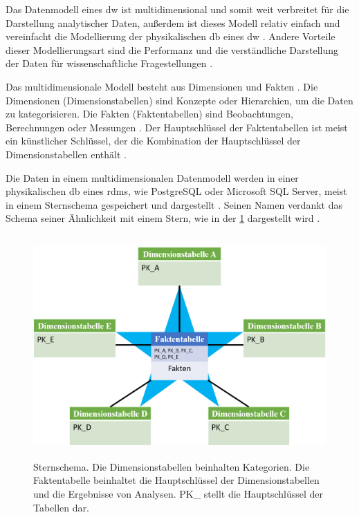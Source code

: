 Das Datenmodell eines \ac{dw} ist multidimensional und somit weit verbreitet für die Darstellung analytischer Daten, außerdem ist dieses Modell relativ einfach und vereinfacht die Modellierung der physikalischen \ac{db} eines \ac{dw} \cite{dwbauer}. Andere Vorteile dieser Modellierungsart sind die Performanz und die verständliche Darstellung der Daten für wissenschaftliche Fragestellungen \cite{dwtool}.

Das multidimensionale Modell besteht aus Dimensionen und Fakten \cite{dworiginal}. Die Dimensionen (Dimensionstabellen) sind Konzepte oder Hierarchien, um die Daten zu kategorisieren. Die Fakten (Faktentabellen) sind Beobachtungen, Berechnungen oder Messungen \cite{dwtool}. Der Hauptschlüssel der Faktentabellen ist meist ein künstlicher Schlüssel, der die Kombination der Hauptschlüssel der Dimensionstabellen enthält \cite{dwbauer, dwtool}. 

Die Daten in einem multidimensionalen Datenmodell werden in einer physikalischen \ac{db} eines \ac{rdms}, wie PostgreSQL oder Microsoft SQL Server, meist in einem Sternschema gespeichert und dargestellt \cite{dworiginal}. Seinen Namen verdankt das Schema seiner Ähnlichkeit mit einem Stern, wie in der \ref{fig:starschema} dargestellt wird \cite{dwtool}.

\clearpage

\begin{figure}[ht]
	\centering
	\includegraphics[height=8.5cm]{figures/starschema}
	\caption[Sternschema]{Sternschema. Die Dimensionstabellen beinhalten Kategorien. Die Faktentabelle beinhaltet die Hauptschlüssel der Dimensionstabellen und die Ergebnisse von Analysen. \glqq PK\_\grqq{} stellt die Hauptschlüssel der Tabellen dar.}
	\label{fig:starschema}
\end{figure}
